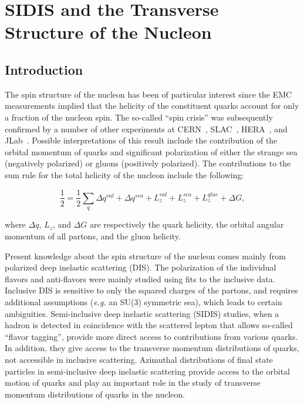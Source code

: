 \chapter{SIDIS and the Transverse Structure of the Nucleon}

\section{Introduction}

The spin structure of the nucleon has been of particular interest since the 
EMC~\cite{Ashman:1987hv} measurements implied that the helicity of the 
constituent quarks account for only a fraction of the nucleon spin.  The 
so-called ``spin crisis'' was subsequently confirmed by a number of other 
experiments at CERN~\cite{Adams:1997tq}, SLAC~\cite{Abe:1998wq,Anthony:1999py},
HERA~\cite{Ackerstaff:1999ey,Airapetian:2004zf}, and JLab~\cite{Fatemi:2003yh}.
Possible interpretations of this result include the contribution of the
orbital momentum of quarks and significant polarization of either the strange 
sea (negatively polarized) or gluons (positively polarized).  The 
contributions to the sum rule for the total helicity of the nucleon
include the following:

\begin{equation}
\frac{1}{2} = \frac{1}{2} \sum_q \Delta q^{val} + \Delta q^{sea}
+L_z^{val} + L_z^{sea} + L_z^{glue} + \Delta G,
\label{angmom_sumrule_a}
\end{equation}

\noindent
where $\Delta q$, $L_z$, and $\Delta G$ are respectively the quark helicity, 
the orbital angular momentum of all partons, and the gluon helicity.

Present knowledge about the spin structure of the nucleon comes mainly from 
polarized deep inelastic scattering (DIS). The polarization of the individual 
flavors and anti-flavors were mainly studied using fits to the inclusive data.
Inclusive DIS is sensitive to only the squared charges of the partons, 
and requires additional assumptions ({\it e.g.} an SU(3) symmetric sea), 
which leads to certain ambiguities.  Semi-inclusive deep inelastic scattering
(SIDIS) studies, when a hadron is detected in coincidence with the scattered 
lepton that allows so-called ``flavor tagging'', provide more direct access to 
contributions from various quarks.  In addition, they give access to the 
transverse momentum distributions of quarks, not accessible in inclusive 
scattering.  Azimuthal distributions of final state particles in semi-inclusive 
deep inelastic scattering  provide access to the orbital motion of quarks and 
play an important role in the study of transverse momentum distributions of 
quarks in the nucleon.

